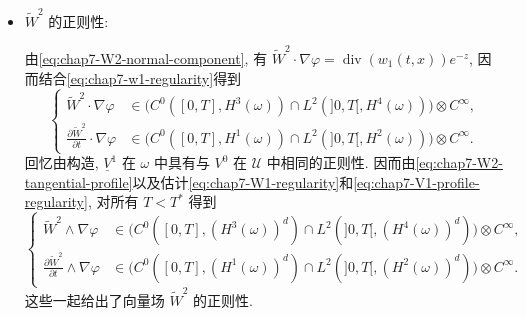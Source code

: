 \begin{sloppypar}
\begin{itemize}
已经看到 $\widetilde q^0=0$, 因而 $q^0=\overline q^0$. 因此由\eqref{eq:chap7-q0-laplace-problem}, 压力项 $\overline q^0$ 满足
\[
\left\{
\begin{aligned}
 \Delta\overline q^0&=0&&\text{于 }\omega,\\
 \overline q^0&=-\left(\frac{\partial V^0}{\partial\nu}\right)\cdot\nu+p^0&&\text{于 }\partial\omega.
\end{aligned}
\right.
\]
由于 $V^0$ 和 $p^0$ 的正则性性质 (估计\eqref{eq:chap7-limit-fluid-regularity}), 利用 Laplace 算子的椭圆正则性性质 (Theorem~\ref{thm:chap3-laplace-dirichlet-regularity}), 对所有 $T<T^*$ 得到
\[
\left\{
\begin{aligned}
 \overline q^0&\in C^0([0,T],H^4(\omega))\cap L^2(]0,T[,H^5(\omega)),\\
 \frac{\partial\overline q^0}{\partial t}&\in C^0([0,T],H^2(\omega))\cap L^2(]0,T[,H^3(\omega)).
\end{aligned}
\right.
\]
最后, 由于 $\overline W^2=-\nabla\overline q^0$, 得
\[
\left\{
\begin{aligned}
 \overline W^2&\in C^0([0,T],(H^3(\omega))^d)\cap L^2(]0,T[,(H^4(\omega))^d),\\
 \frac{\partial\overline W^2}{\partial t}&\in C^0([0,T],(H^1(\omega))^d)\cap L^2(]0,T[,(H^2(\omega))^d).
\end{aligned}
\right.
\]

\item $\widetilde W^2$ 的正则性:

由\eqref{eq:chap7-W2-normal-component}, 有 $\widetilde W^2\cdot\nabla\varphi=\operatorname{div}(w_1(t,x))e^{-z}$, 因而结合\eqref{eq:chap7-w1-regularity}得到
\[
\left\{
\begin{aligned}
 \widetilde W^2\cdot\nabla\varphi&\in\bigl(C^0([0,T],H^3(\omega))\cap L^2(]0,T[,H^4(\omega))\bigr)\otimes C^\infty,\\
 \frac{\partial\widetilde W^2}{\partial t}\cdot\nabla\varphi&\in\bigl(C^0([0,T],H^1(\omega))\cap L^2(]0,T[,H^2(\omega))\bigr)\otimes C^\infty.
\end{aligned}
\right.
\]
回忆由构造, $\underline V^1$ 在 $\omega$ 中具有与 $V^0$ 在 $\mathcal U$ 中相同的正则性. 因而由\eqref{eq:chap7-W2-tangential-profile}以及估计\eqref{eq:chap7-W1-regularity}和\eqref{eq:chap7-V1-profile-regularity}, 对所有 $T<T^*$ 得到
\[
\left\{
\begin{aligned}
 \widetilde W^2\wedge\nabla\varphi&\in\bigl(C^0([0,T],(H^3(\omega))^d)\cap L^2(]0,T[,(H^4(\omega))^d)\bigr)\otimes C^\infty,\\
 \frac{\partial\widetilde W^2}{\partial t}\wedge\nabla\varphi&\in\bigl(C^0([0,T],(H^1(\omega))^d)\cap L^2(]0,T[,(H^2(\omega))^d)\bigr)\otimes C^\infty.
\end{aligned}
\right.
\]
这些一起给出了向量场 $\widetilde W^2$ 的正则性.


\end{itemize}
\end{sloppypar}
